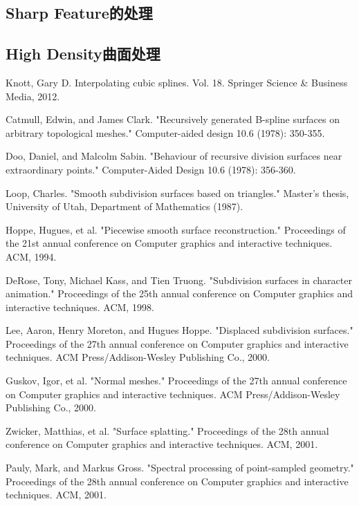 \documentclass[11pt]{article}
\begin{document}
\subsection{Sharp Feature的处理}

\subsection{High Density曲面处理}


\begin{thebibliography}{1}
 Knott, Gary D. Interpolating cubic splines. Vol. 18. Springer Science \& Business Media, 2012.

Catmull, Edwin, and James Clark. "Recursively generated B-spline surfaces on arbitrary topological meshes." Computer-aided design 10.6 (1978): 350-355.

 Doo, Daniel, and Malcolm Sabin. "Behaviour of recursive division surfaces near extraordinary points." Computer-Aided Design 10.6 (1978): 356-360.

 Loop, Charles. "Smooth subdivision surfaces based on triangles." Master's thesis, University of Utah, Department of Mathematics (1987).

 Hoppe, Hugues, et al. "Piecewise smooth surface reconstruction." Proceedings of the 21st annual conference on Computer graphics and interactive techniques. ACM, 1994.

 DeRose, Tony, Michael Kass, and Tien Truong. "Subdivision surfaces in character animation." Proceedings of the 25th annual conference on Computer graphics and interactive techniques. ACM, 1998.

 Lee, Aaron, Henry Moreton, and Hugues Hoppe. "Displaced subdivision surfaces." Proceedings of the 27th annual conference on Computer graphics and interactive techniques. ACM Press/Addison-Wesley Publishing Co., 2000.

 Guskov, Igor, et al. "Normal meshes." Proceedings of the 27th annual conference on Computer graphics and interactive techniques. ACM Press/Addison-Wesley Publishing Co., 2000.

Zwicker, Matthias, et al. "Surface splatting." Proceedings of the 28th annual conference on Computer graphics and interactive techniques. ACM, 2001.

\bibitem{} Pauly, Mark, and Markus Gross. "Spectral processing of point-sampled geometry." Proceedings of the 28th annual conference on Computer graphics and interactive techniques. ACM, 2001.


\end{thebibliography}
\end{document}
